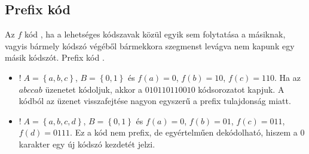 \documentclass[../main.tex]{subfiles}
\begin{document}
\subsection{Prefix kód}

Az $f$ kód , ha a lehetséges kódszavak közül
egyik sem folytatása a másiknak, vagyis bármely kódszó
végéből bármekkora szegmenst levágva nem kapunk egy másik
kódszót. Prefix kód .
\begin{itemize}
  \item $! \; A = \left\{a, b, c\right\}$, $B = \left\{ 0, 1\right\}$
        és $f(a) = 0$, $f(b) = 10$, $f(c) = 110$. Ha az $abccab$ üzenetet
        kódoljuk, akkor a $010110110010$ kódsorozatot kapjuk. A kódból
        az üzenet visszafejtése nagyon egyszerű a prefix tulajdonság miatt.

  \item  $! \; A = \left\{a, b, c, d\right\}$, $B = \left\{ 0, 1\right\}$
        és $f(a) = 0$, $f(b) = 01$, $f(c) = 011$, $f(d)=0111$.
        Ez a kód nem prefix, de egyértelműen dekódolható, hiszem a $0$
        karakter egy új kódszó kezdetét jelzi.
\end{itemize}
\end{document}
